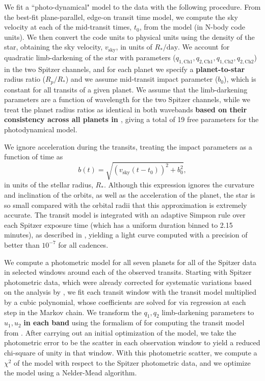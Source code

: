 \documentclass[twocolumn]{aastex63}
\begin{document}
We fit a ``photo-dynamical" model \citep{Carter2012} to the data with the following procedure.
From the best-fit plane-parallel, edge-on transit time model,
we compute the sky velocity at each of the mid-transit times, $t_0$,
from the model (in N-body code units).  We then convert the code units to physical
units using the density of the star, obtaining the sky velocity, $v_\mathrm{sky}$, in units
of $R_*/\mathrm{day}$.
We account for quadratic limb-darkening of the star with parameters ($q_\mathrm{1,Ch1}, q_\mathrm{2,Ch1},q_\mathrm{1,Ch2},q_\mathrm{2,Ch2}$) in the two Spitzer channels, and for each
planet we specify a \textbf{planet-to-star} radius ratio ($R_p/R_*$) and we assume
mid-transit impact parameter ($b_0$), which is constant for all transits of
a given planet.  We assume that the limb-darkening parameters are a function
of wavelength for the two Spitzer channels, while we treat the planet radius
ratios as identical in both wavebands \textbf{based on their consistency across
all planets in \citet{Ducrot2020}}, giving a total of 19 free parameters
for the photodynamical model.

We ignore acceleration during the transits, treating the impact parameters as
a function of time as
\begin{equation}
    b(t) = \sqrt{(v_\mathrm{sky} (t-t_0))^2 + b_0^2},
\end{equation}
in units of the stellar radius, $R_*$.
Although this expression ignores the curvature and inclination of the orbits, as well
as the acceleration of the planet, the star is so small compared with the orbital
radii that this approximation is extremely accurate.  The transit model is integrated
with an adaptive Simpson rule over each Spitzer exposure time (which has a uniform
duration binned to 2.15 minutes), as described in \citet{Agol2019}, yielding
a light curve computed with a precision of better than $10^{-7}$ for all cadences.

We compute a photometric model for all seven
planets for all of the Spitzer data in selected windows around each of the observed
transits.  Starting with Spitzer photometric data, which were already corrected for systematic
variations based on the analysis by \citet{Ducrot2020}, we fit  each transit window
with the transit model multiplied by a cubic polynomial, whose coefficients are solved
for via regression at each step in the Markov chain.
We
transform the $q_1, q_2$ limb-darkening
parameters to $u_1,u_2$ \textbf{in each band} using the formalism of \citet{Kipping2013} for computing the transit model from \citet{Agol2019}.  After carrying out an initial
optimization of the model, we take the photometric error to be the
scatter in each observation window to yield a reduced chi-square of unity in
that  window.  With this photometric
scatter, we compute a $\chi^2$ of the model with respect to the Spitzer
photometric data, and we optimize the model using a Nelder-Mead algorithm.
\end{document}
